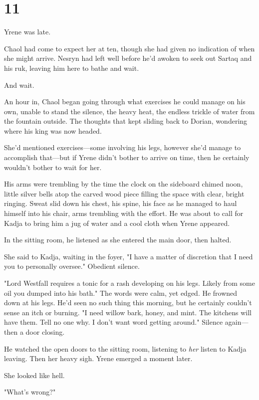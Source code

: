 
\chapter{11}

Yrene was late.

Chaol had come to expect her at ten, though she had given no indication of when she might arrive. Nesryn had left well before he'd awoken to seek out Sartaq and his ruk, leaving him here to bathe and 
wait.

And wait.

An hour in, Chaol began going through what exercises he could manage on his own, unable to stand the silence, the heavy heat, the endless trickle of water from the fountain outside. The thoughts that kept sliding back to Dorian, wondering where his king was now headed.

She'd mentioned exercises---some involving his legs, however she'd manage to accomplish that---but if Yrene didn't bother to arrive on time, then he certainly wouldn't bother to wait for her.

His arms were trembling by the time the clock on the sideboard chimed noon, little silver bells atop the carved wood piece filling the space with clear, bright ringing. Sweat slid down his chest, his spine, his face as he managed to haul himself into his chair, arms trembling with the effort. He was about to call for Kadja to bring him a jug of water and a cool cloth when Yrene appeared.

In the sitting room, he listened as she entered the main door, then halted.

She said to Kadja, waiting in the foyer, "I have a matter of discretion that I need you to personally oversee." Obedient silence.

"Lord Westfall requires a tonic for a rash developing on his legs. Likely from some oil you dumped into his bath." The words were calm, yet edged. He frowned down at his legs. He'd seen no such thing this morning, but he certainly couldn't sense an itch or burning. "I need willow bark, honey, and mint. The kitchens will have them. Tell no one why. I don't want word getting around." Silence again---then a door closing.

He watched the open doors to the sitting room, listening to \emph{her}
listen to Kadja leaving. Then her heavy sigh. Yrene emerged a moment later.

She looked like hell.

"What's wrong?"

